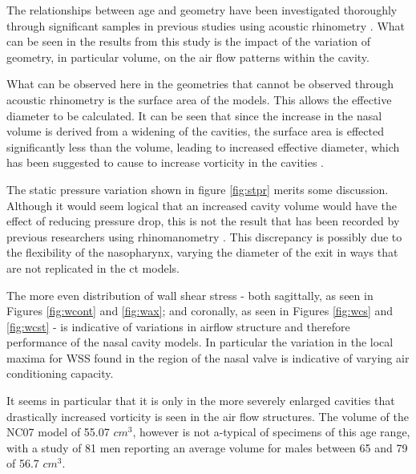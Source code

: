 
The relationships between age and geometry have been investigated thoroughly through significant samples in previous studies using acoustic rhinometry \cite{Kalmovich2005, WhanKim2007, Edelstein1996}. What can be seen in the results from this study is the impact of the variation of geometry, in particular volume, on the air flow patterns within the cavity. 

What can be observed here in the geometries that cannot be observed through acoustic rhinometry is the surface area of the models. This allows the effective diameter to be calculated.  It can be seen that since the increase in the nasal volume is derived from a widening of the cavities, the surface area is effected significantly less than the volume, leading to increased effective diameter, which has been suggested to cause to increase vorticity in the cavities \cite{Garcia2007}.

The static pressure variation shown in figure \ref{fig:stpr} merits some discussion. Although it would seem logical that an increased cavity volume would have the effect of reducing pressure drop, this is not the result that has been recorded by previous researchers using rhinomanometry \cite{Lindemann2008}. This discrepancy is possibly due to the flexibility of the nasopharynx, varying the diameter of the exit in ways that are not replicated in the ct models.

The more even distribution of wall shear stress - both sagittally, as seen in Figures \ref{fig:wcont} and \ref{fig:wax}; and coronally, as seen in Figures \ref{fig:wcs} and \ref{fig:wcst} - is indicative of variations in airflow structure and therefore performance of the nasal cavity models. In particular the variation in the local maxima for WSS found in the region of the nasal valve is indicative of varying air conditioning capacity.

It seems in particular that it is only in the more severely enlarged cavities that drastically increased vorticity is seen in the air flow structures. The volume of the NC07 model of 55.07 $cm^3$, however is not a-typical of specimens of this age range, with a study of 81 men reporting an average volume for males between 65 and 79 of 56.7 $cm^3$\cite{Kalmovich2005}.

